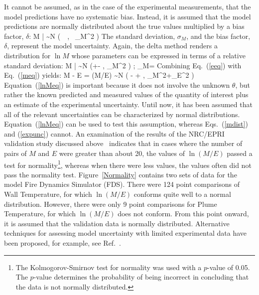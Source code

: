 It cannot be assumed, as in the case of the experimental measurements, that the model predictions have no systematic bias. Instead,
it is assumed that the model predictions are normally distributed about the true values
multiplied by a bias factor, $\delta$:
\be
   M \; | \; \theta \sim N \left(\delta \, \theta \, , \, \sigma_M^2 \right) \label{mdist}
\ee
The standard deviation, $\sigma_M$, and the bias factor, $\delta$, represent the model uncertainty.
Again, the delta method renders a distribution for $\ln M$ whose parameters can be expressed in terms of a
relative standard deviation:
\be
   \ln M \; | \; \theta \sim N \left(\ln \delta +\ln \theta -  \; , \;
   \widetilde{\sigma}_M^2 \right) \quad ; \quad \widetilde{\sigma}_M= \label{meq}
\ee
Combining Eq.~(\ref{eeq}) with Eq.~(\ref{meq}) yields:
\be
   \ln M  - \ln E = \ln(M/E) \sim N \left( \ln \delta - + \; ,
   \; \widetilde{\sigma}_M^2+\widetilde{\sigma}_E^2 \right) \label{lnMeq}
\ee
Equation~(\ref{lnMeq}) is important because it does not involve the unknown $\theta$, but rather the known predicted and measured values of the quantity
of interest plus an estimate of the experimental uncertainty. Until now, it has been assumed that all of the relevant uncertainties can be characterized
by normal distributions. Equation~(\ref{lnMeq}) can be used to test this assumption, whereas Eqs.~(\ref{mdist}) and (\ref{expunc}) cannot.
An examination of the results of the NRC/EPRI validation study discussed above~\cite{NUREG_1824}
indicates that in cases where the number of pairs of $M$ and $E$ were greater than about 20, the values of $\ln (M/E)$ passed a test for
normality\footnote{The Kolmogorov-Smirnov test for
normality was used with a $p$-value of 0.05. The $p$-value determines the probability of being incorrect in concluding that the data is not normally distributed.}, whereas when
there were less values, the values often did not pass the normality test. Figure~\ref{Normality} contains two sets of data for the model Fire Dynamics Simulator (FDS).
There were 124 point comparisons of Wall Temperature, for which $\ln (M/E)$ conforms quite well to a normal distribution. However, there were only 9 point comparisons
for Plume Temperature, for which $\ln (M/E)$ does not conform.
From this point onward, it is assumed that the validation data is normally distributed. Alternative techniques for assessing model uncertainty with limited
experimental data have been proposed, for example, see Ref.~\cite{Siu:1992}.
